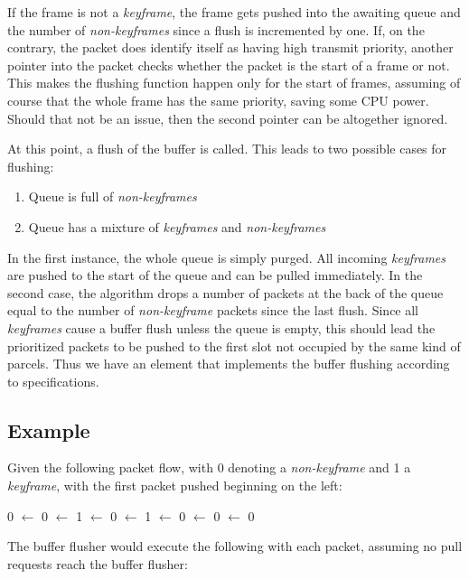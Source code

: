 If the frame is not a \textit{keyframe}, the frame gets pushed into the awaiting queue and the number of \textit{non-keyframes} since a flush is incremented by one. If, on the contrary, the packet does identify itself as having high transmit priority, another pointer into the packet checks whether the packet is the start of a frame or not. This makes the flushing function happen only for the start of frames, assuming of course that the whole frame has the same priority, saving some CPU power. Should that not be an issue, then the second pointer can be altogether ignored. 

At this point, a flush of the buffer is called. This leads to two possible cases for flushing:
\begin{enumerate}
\item{Queue is full of \textit{non-keyframes}}
\item{Queue has a mixture of \textit{keyframes} and \textit{non-keyframes}}
\end{enumerate}

In the first instance, the whole queue is simply purged. All incoming \textit{keyframes} are pushed to the start of the queue and can be pulled immediately. In the second case, the algorithm drops a number of packets at the back of the queue equal to the number of \textit{non-keyframe} packets since the last flush. Since all \textit{keyframes} cause a buffer flush unless the queue is empty, this should lead the prioritized packets to be pushed to the first slot not occupied by the same kind of parcels. Thus we have an element that implements the buffer flushing according to specifications.

\subsection{Example}

Given the following packet flow, with 0 denoting a \textit{non-keyframe} and 1 a \textit{keyframe}, with the first packet pushed beginning on the left:


\begin{center}
0 $\leftarrow$ 0 $\leftarrow$ 1 $\leftarrow$ 0 $\leftarrow$ 1 $\leftarrow$ 0 $\leftarrow$ 0 $\leftarrow$ 0
\end{center}

The buffer flusher would execute the following with each packet, assuming no pull requests reach the buffer flusher:

